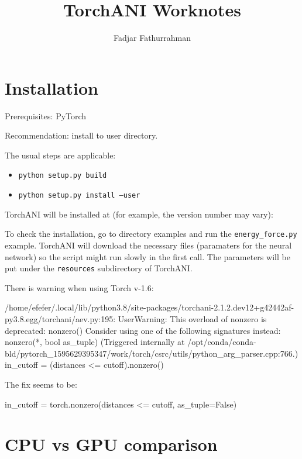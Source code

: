 \documentclass[a4paper,12pt]{article} %
\newcommand{\txtinline}[1]{\texttt{#1}}
\begin{document}
\title{TorchANI Worknotes}
\author{Fadjar Fathurrahman}
\date{}
\maketitle

\section{Installation}

Prerequisites: PyTorch

Recommendation: install to user directory.

The usual steps are applicable:
\begin{itemize}
\item \txtinline{python setup.py build}
\item \txtinline{python setup.py install --user}
\end{itemize}

TorchANI will be installed at (for example, the version number
may vary):

To check the installation, go to directory examples and run the
\txtinline{energy_force.py} example.
TorchANI will download the necessary files (paramaters for the neural network)
so the script might run slowly in the first call.
The parameters will be put under the \txtinline{resources} subdirectory of TorchANI.

There is warning when using Torch v-1.6:
\begin{textcode}
/home/efefer/.local/lib/python3.8/site-packages/torchani-2.1.2.dev12+g42442af-py3.8.egg/torchani/aev.py:195: UserWarning: This overload of nonzero is deprecated:
	nonzero()
Consider using one of the following signatures instead:
	nonzero(*, bool as_tuple) (Triggered internally at  /opt/conda/conda-bld/pytorch_1595629395347/work/torch/csrc/utils/python_arg_parser.cpp:766.)
in_cutoff = (distances <= cutoff).nonzero()
\end{textcode}

The fix seems to be:
\begin{pythoncode}
in_cutoff = torch.nonzero(distances <= cutoff, as_tuple=False)
\end{pythoncode}

\section{CPU vs GPU comparison}
\end{document}
